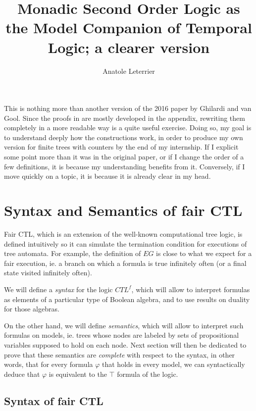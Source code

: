 \documentclass[11pt]{article}
\title{Monadic Second Order Logic as the Model Companion of Temporal Logic; a clearer version}
\author{Anatole Leterrier}
\begin{document}
\maketitle

This is nothing more than another version of the 2016 paper by Ghilardi and van Gool. Since the proofs in \cite{GhivG16} are mostly developed in the appendix, rewriting them completely in a more readable way is a quite useful exercise. Doing so, my goal is to understand deeply how the constructions work, in order to produce my own version for finite trees with counters by the end of my internship. If I explicit some point more than it was in the original paper, or if I change the order of a few definitions, it is because my understanding benefits from it. Conversely, if I move quickly on a topic, it is because it is already clear in my head.
\section{Syntax and Semantics of fair CTL}\label{sec:synt_sem}

Fair CTL, which is an extension of the well-known computational tree logic, is defined intuitively so it can simulate the termination condition for executions of tree automata. For example, the definition of $EG$ is close to what we expect for a fair execution, ie. a branch on which a formula is true infinitely often (or a final state visited infinitely often). 

We will define a \emph{syntax} for the logic $CTL^{f}$, which will allow to interpret formulas as elements of a particular type of Boolean algebra, and to use results on duality for those algebras. 

On the other hand, we will define \emph{semantics}, which will allow to interpret such formulas on models, ie. trees whose nodes are labeled by sets of propositional variables supposed to hold on each node. Next section will then be dedicated to prove that these semantics are \emph{complete} with respect to the syntax, in other words, that for every formula $\varphi$ that holds in every model, we can syntactically deduce that $\varphi$ is equivalent to the $\top$ formula of the logic.

\subsection*{Syntax of fair CTL}\label{subsec:syntax_CTLf}
\end{document}
